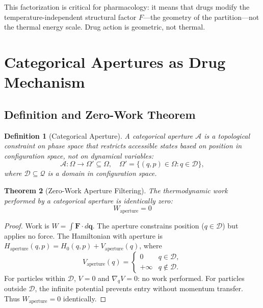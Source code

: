 \documentclass[twocolumn,10pt]{article}
\newtheorem{theorem}{Theorem}[section]
\newtheorem{definition}[theorem]{Definition}
\theoremstyle{remark}
\begin{document}
This factorization is critical for pharmacology: it means that drugs modify the temperature-independent structural factor $F$---the geometry of the partition---not the thermal energy scale. Drug action is geometric, not thermal.

\section{Categorical Apertures as Drug Mechanism}
\label{sec:apertures}

\subsection{Definition and Zero-Work Theorem}

\begin{definition}[Categorical Aperture]
\label{def:aperture}
A categorical aperture $\mathcal{A}$ is a topological constraint on phase space that restricts accessible states based on position in configuration space, not on dynamical variables:
\begin{equation}
  \mathcal{A}: \Omega \to \Omega' \subseteq \Omega, \quad \Omega' = \{(q, p) \in \Omega : q \in \mathcal{D}\},
\end{equation}
where $\mathcal{D} \subseteq \mathcal{Q}$ is a domain in configuration space.
\end{definition}

\begin{theorem}[Zero-Work Aperture Filtering]
\label{thm:zero_work}
The thermodynamic work performed by a categorical aperture is identically zero:
\begin{equation}
  \boxed{W_{\mathrm{aperture}} = 0}
\end{equation}
\end{theorem}

\begin{proof}
Work is $W = \int \mathbf{F} \cdot d\mathbf{q}$. The aperture constrains position ($q \in \mathcal{D}$) but applies no force. The Hamiltonian with aperture is $H_{\mathrm{aperture}}(q,p) = H_0(q,p) + V_{\mathrm{aperture}}(q)$, where
\begin{equation}
  V_{\mathrm{aperture}}(q) = \begin{cases} 0 & q \in \mathcal{D}, \\ +\infty & q \notin \mathcal{D}. \end{cases}
\end{equation}
For particles within $\mathcal{D}$, $V = 0$ and $\nabla_q V = 0$: no work performed. For particles outside $\mathcal{D}$, the infinite potential prevents entry without momentum transfer. Thus $W_{\mathrm{aperture}} = 0$ identically.
\end{proof}
\end{document}
